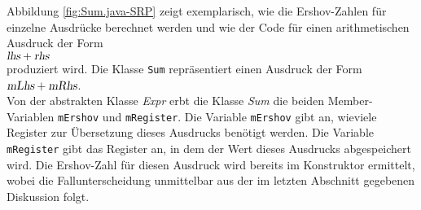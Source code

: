 Abbildung \ref{fig:Sum.java-SRP} zeigt exemplarisch, wie die Ershov-Zahlen f\"ur einzelne
Ausdr\"ucke berechnet werden und wie der Code f\"ur einen arithmetischen Ausdruck der Form
\\[0.2cm]
\hspace*{1.3cm}
$\textsl{lhs} + \textsl{rhs}$
\\[0.2cm]
produziert
wird.  Die Klasse \texttt{Sum} repr\"asentiert einen Ausdruck der Form
\\[0.2cm]
\hspace*{1.3cm}
$\textsl{mLhs} + \textsl{mRhs}$.
\\[0.2cm]
Von der abstrakten Klasse \textsl{Expr} erbt die Klasse \textsl{Sum} die beiden
Member-Variablen \texttt{mErshov} und \texttt{mRegister}.  Die Variable \texttt{mErshov}
gibt an, wieviele Register zur \"Ubersetzung dieses Ausdrucks ben\"otigt werden.  Die Variable
\texttt{mRegister} gibt das Register an, in dem der Wert dieses Ausdrucks abgespeichert wird.
Die Ershov-Zahl f\"ur diesen Ausdruck wird bereits im Konstruktor ermittelt, wobei die
Fallunterscheidung unmittelbar aus der im letzten Abschnitt gegebenen Diskussion folgt.

